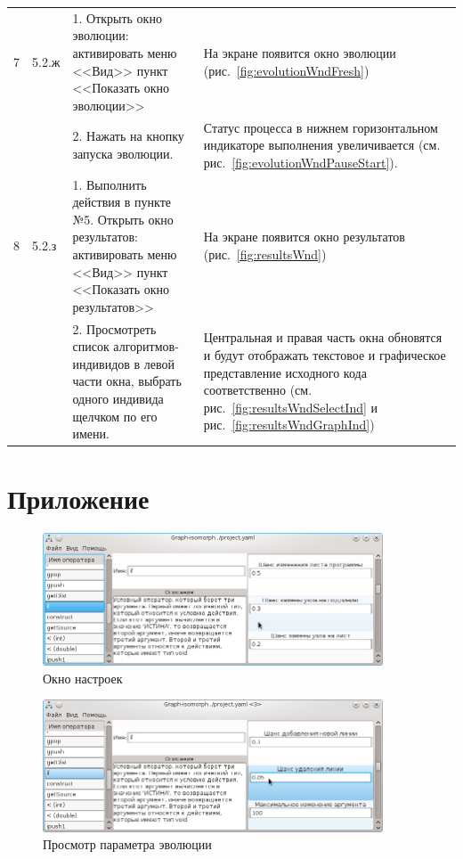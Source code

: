 \documentclass[russian,utf8,emptystyle]{eskdtext}
\begin{document}
\begin{longtable}{
  p{0.7cm}|p{1.5cm}|p{6.5cm}|p{6.5cm}
}
7 & 5.2.ж & 1. Открыть окно эволюции: активировать меню <<Вид>> пункт <<Показать окно эволюции>> & На экране появится окно эволюции (рис.~\ref{fig:evolutionWndFresh})\\
\cline{3-4}
  &       & 2. Нажать на кнопку запуска эволюции. & Статус процесса в нижнем горизонтальном индикаторе выполнения увеличивается (см. рис.~\ref{fig:evolutionWndPauseStart}). \\
\hline

8 & 5.2.з & 1. Выполнить действия в пункте №5. Открыть окно результатов: активировать меню <<Вид>> пункт <<Показать окно результатов>> & На экране появится окно результатов (рис.~\ref{fig:resultsWnd})\\
\cline{3-4}
  &       & 2. Просмотреть список алгоритмов-индивидов в левой части окна, выбрать одного индивида щелчком по его имени. & Центральная и правая часть окна обновятся и будут отображать текстовое и графическое представление исходного кода соответственно (см. рис.~\ref{fig:resultsWndSelectInd} и рис.~\ref{fig:resultsWndGraphInd}) \\
\end{longtable} 

\newpage
\section{Приложение}

\begin{figure}[h!]
\centering
\includegraphics[width=0.9\textwidth]{screen07}
\caption{Окно настроек}
\label{fig:optionsWnd}
\end{figure}

\begin{figure}[h!]
\centering
\includegraphics[width=0.9\textwidth]{screen12}
\caption{Просмотр параметра эволюции}
\label{fig:parSelect}
\end{figure}
\end{document}
